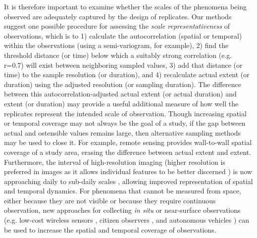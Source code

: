 \documentclass[12pt]{article}
\begin{document}
It is therefore important to examine whether the scales of the phenomena being observed are adequately captured by the design of replicates. Our methods suggest one possible procedure for assessing the \emph{scale representativeness} of observations, which is to 1) calculate the autocorrelation (spatial or temporal) within the observations (using a semi-variogram, for example), 2) find the threshold distance (or time) below which a suitably strong correlation (e.g. r=0.7) will exist between neighboring sampled values, 3) add that distance (or time) to the sample resolution (or duration), and 4) recalculate actual extent (or duration) using the adjusted resolution (or sampling duration). The difference between this autocorrelation-adjusted actual extent (or actual duration) and extent (or duration) may provide a useful additional measure of how well the replicates represent the intended scale of observation. Though increasing spatial or temporal coverage may not always be the goal of a study, if the gap between actual and ostensible values remains large, then alternative sampling methods may be used to close it. For example, remote sensing provides wall-to-wall spatial coverage of a study area, erasing the difference between actual extent and extent. Furthermore, the interval of high-resolution imaging (higher resolution is preferred in images as it allows individual features to be better discerned \cite{dark_modifiable_2007, hay_comparison_2003}) is now approaching daily to sub-daily scales \cite{drusch_sentinel-2:_2012, hand_startup_2015}, allowing improved representation of spatial and temporal dynamics. For phenomena that cannot be measured from space, either because they are not visible or because they require continuous observation, new approaches for collecting \emph{in situ} or near-surface observations (e.g. low-cost wireless sensors \cite{wolf_gsm-based_2012, collins_new_2006, porter_wireless_2005}, citizen observers \cite{dickinson_current_2012}, and autonomous vehicles \cite{anderson_lightweight_2013}) can be used to increase the spatial and temporal coverage of observations.
\end{document}
